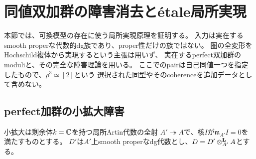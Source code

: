 \section{同値双加群の障害消去とétale局所実現}\label{er:sec:etale}
本節では、可換模型の存在に使う局所実現原理を証明する。
入力は実在するsmooth properな代数的dg族であり、proper性だけの族ではない。
圏の全変形をHochschild複体から実現するという主張は用いず、
実在するperfect双加群のmoduliと、その完全な障害理論を用いる。
ここでのpairは自己同値一つを指定したもので、$\rho^3\simeq[2]$という
選択された同型やそのcoherenceを追加データとして含めない。

\subsection{perfect加群の小拡大障害}
小拡大は剰余体$k=\mathbb C$を持つ局所Artin代数の全射
$A'\twoheadrightarrow A$で、核$I$が$\mathfrak m_{A'}I=0$を満たすものとする。
$D'$は$A'$上smooth properなdg代数とし、$D=D'\otimes^{\mathbf L}_{A'}A$とする。

